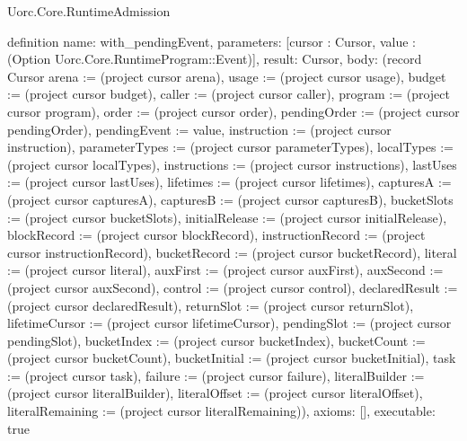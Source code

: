 \begin{lexlean}{Uorc.Core.RuntimeAdmission}
\begin{semanticmodule}
definition{
  name: with_pendingEvent,
  parameters: [cursor : Cursor, value : (Option Uorc.Core.RuntimeProgram::Event)],
  result: Cursor,
  body: (record Cursor {arena := (project cursor arena), usage := (project cursor usage), budget := (project cursor budget), caller := (project cursor caller), program := (project cursor program), order := (project cursor order), pendingOrder := (project cursor pendingOrder), pendingEvent := value, instruction := (project cursor instruction), parameterTypes := (project cursor parameterTypes), localTypes := (project cursor localTypes), instructions := (project cursor instructions), lastUses := (project cursor lastUses), lifetimes := (project cursor lifetimes), capturesA := (project cursor capturesA), capturesB := (project cursor capturesB), bucketSlots := (project cursor bucketSlots), initialRelease := (project cursor initialRelease), blockRecord := (project cursor blockRecord), instructionRecord := (project cursor instructionRecord), bucketRecord := (project cursor bucketRecord), literal := (project cursor literal), auxFirst := (project cursor auxFirst), auxSecond := (project cursor auxSecond), control := (project cursor control), declaredResult := (project cursor declaredResult), returnSlot := (project cursor returnSlot), lifetimeCursor := (project cursor lifetimeCursor), pendingSlot := (project cursor pendingSlot), bucketIndex := (project cursor bucketIndex), bucketCount := (project cursor bucketCount), bucketInitial := (project cursor bucketInitial), task := (project cursor task), failure := (project cursor failure), literalBuilder := (project cursor literalBuilder), literalOffset := (project cursor literalOffset), literalRemaining := (project cursor literalRemaining)}),
  axioms: [],
  executable: true
}


\end{semanticmodule}
\end{lexlean}
